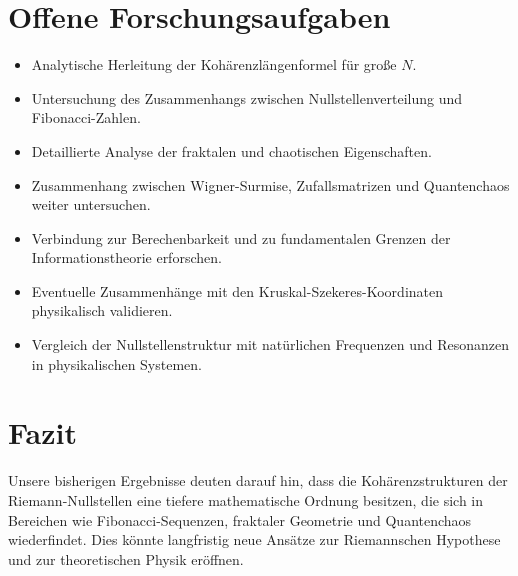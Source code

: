 \documentclass[a4paper,12pt]{article}
\begin{document}
\section{Offene Forschungsaufgaben}
\begin{itemize}
    \item Analytische Herleitung der Kohärenzlängenformel für große \( N \).
    \item Untersuchung des Zusammenhangs zwischen Nullstellenverteilung und Fibonacci-Zahlen.
    \item Detaillierte Analyse der fraktalen und chaotischen Eigenschaften.
    \item Zusammenhang zwischen Wigner-Surmise, Zufallsmatrizen und Quantenchaos weiter untersuchen.
    \item Verbindung zur Berechenbarkeit und zu fundamentalen Grenzen der Informationstheorie erforschen.
    \item Eventuelle Zusammenhänge mit den Kruskal-Szekeres-Koordinaten physikalisch validieren.
    \item Vergleich der Nullstellenstruktur mit natürlichen Frequenzen und Resonanzen in physikalischen Systemen.
\end{itemize}

\section{Fazit}
Unsere bisherigen Ergebnisse deuten darauf hin, dass die Kohärenzstrukturen der Riemann-Nullstellen eine tiefere mathematische Ordnung besitzen, die sich in Bereichen wie Fibonacci-Sequenzen, fraktaler Geometrie und Quantenchaos wiederfindet. Dies könnte langfristig neue Ansätze zur Riemannschen Hypothese und zur theoretischen Physik eröffnen.
\end{document}
